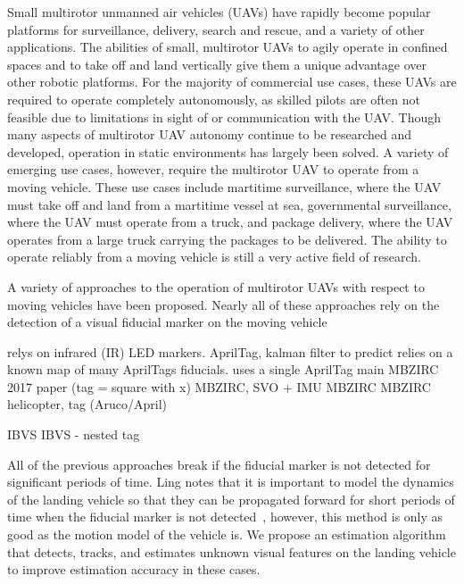 
Small multirotor unmanned air vehicles (UAVs) have rapidly become popular platforms for
surveillance, delivery, search and rescue, and a variety of other applications.
The abilities of small, multirotor UAVs to agily operate in confined spaces and to
take off and land vertically give them a unique advantage over other robotic
platforms. For the majority of commercial use cases, these UAVs are required to operate
completely autonomously, as skilled pilots are often not feasible due to
limitations in sight of or communication with the UAV. Though many aspects of
multirotor UAV autonomy continue to be researched and developed, operation in
static environments has largely been solved. A variety of emerging use cases,
however, require the multirotor UAV to operate from a moving vehicle. These use
cases include martitime surveillance, where the UAV must take off and land from
a martitime vessel at sea, governmental surveillance, where the UAV must operate
from a truck, and package delivery, where the UAV operates from a large truck
carrying the packages to be delivered. The ability to operate reliably from a
moving vehicle is still a very active field of research.

A variety of approaches to the operation of multirotor UAVs with respect to
moving vehicles have been proposed. Nearly all of these approaches rely on the
detection of a visual fiducial marker on the moving vehicle

\cite{wenzel2011automatic} relys on infrared (IR) LED markers.
\cite{ling2014precision} AprilTag, kalman filter to predict
\cite{araar2017vision} relies on a known map of many AprilTags fiducials.
\cite{borowczyk2017autonomous} uses a single AprilTag
\cite{baca2019autonomous} main MBZIRC 2017 paper (tag = square with x)
\cite{falanga2017vision} MBZIRC, SVO + IMU
\cite{beul2017fast} MBZIRC
\cite{cantelli2017autonomous} MBZIRC
\cite{marantos2018vision} helicopter, tag (Aruco/April)

\cite{lee2012autonomous} IBVS
\cite{wynn2019visual} IBVS - nested tag

All of the previous approaches break if the fiducial marker is not detected for
significant periods of time. Ling notes that it is important to model the
dynamics of the landing vehicle so that they can be propagated forward for short
periods of time when the fiducial marker is not
detected~\cite{ling2014precision}, however, this method is only as good as the
motion model of the vehicle is. We propose an estimation algorithm that detects,
tracks, and estimates unknown visual features on the landing vehicle to improve
estimation accuracy in these cases.

